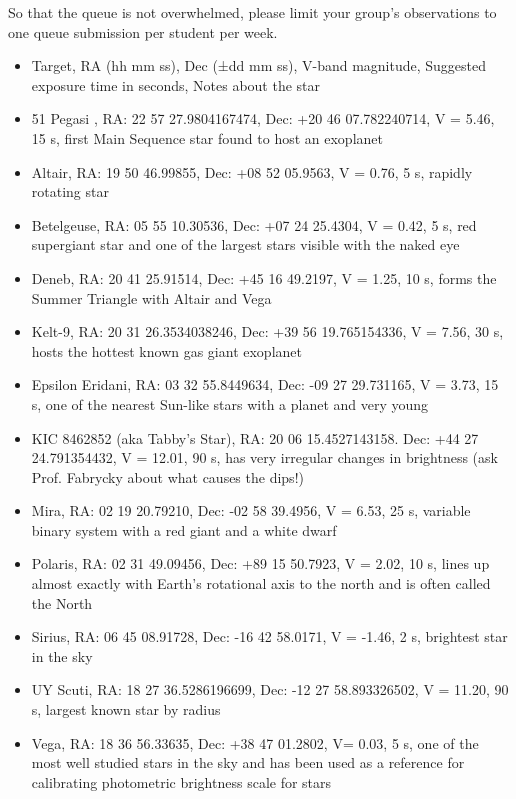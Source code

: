 So that the queue is not overwhelmed, please limit your group's observations to one queue submission per student per week.

\begin{itemize}

	\item Target, RA (hh mm ss), Dec (±dd mm ss), V-band magnitude, Suggested exposure time in seconds, Notes about the star
	
	\item 51 Pegasi , RA: 22 57 27.9804167474, Dec: +20 46 07.782240714, V = 5.46, 15 s, first Main Sequence star found to host an exoplanet
	
	\item Altair, RA: 19 50 46.99855, Dec: +08 52 05.9563, V = 0.76, 5 s, rapidly rotating star
	
	\item Betelgeuse, RA: 05 55 10.30536, Dec: +07 24 25.4304, V = 0.42, 5 s, red supergiant star and one of the largest stars visible with the naked eye

	\item Deneb, RA: 20 41 25.91514, Dec: +45 16 49.2197, V = 1.25, 10 s, forms the Summer Triangle with Altair and Vega 
	
	\item Kelt-9, RA: 20 31 26.3534038246, Dec: +39 56 19.765154336, V = 7.56, 30 s, hosts the hottest known gas giant exoplanet
	
	\item Epsilon Eridani, RA: 03 32 55.8449634, Dec: -09 27 29.731165, V = 3.73, 15 s, one of the nearest Sun-like stars with a planet and very young
	
	\item KIC 8462852 (aka Tabby's Star), RA: 20 06 15.4527143158. Dec: +44 27 24.791354432, V = 12.01, 90 s, has very irregular changes in brightness (ask Prof. Fabrycky about what causes the dips!)
	
	\item Mira, RA: 02 19 20.79210, Dec: -02 58 39.4956, V = 6.53, 25 s, variable binary system with a red giant and a white dwarf
	
	\item Polaris, RA: 02 31 49.09456,  Dec: +89 15 50.7923, V = 2.02, 10 s, lines up almost exactly with Earth's rotational axis to the north and is often called the North
	
	\item Sirius, RA: 06 45 08.91728, Dec: -16 42 58.0171, V = -1.46, 2 s, brightest star in the sky
	
	\item UY Scuti, RA: 18 27 36.5286196699, Dec: -12 27 58.893326502, V = 11.20, 90 s, largest known star by radius
	
	\item Vega, RA: 18 36 56.33635, Dec: +38 47 01.2802, V= 0.03, 5 s, one of the most well studied stars in the sky and has been used as a reference for calibrating photometric brightness scale for stars

\end{itemize}


